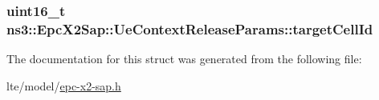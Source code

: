 \subsubsection[{\texorpdfstring{target\+Cell\+Id}{targetCellId}}]{\setlength{\rightskip}{0pt plus 5cm}uint16\+\_\+t ns3\+::\+Epc\+X2\+Sap\+::\+Ue\+Context\+Release\+Params\+::target\+Cell\+Id}\hypertarget{structns3_1_1EpcX2Sap_1_1UeContextReleaseParams_af10d3411c400fcf90dce0120c18fa6ee}{}\label{structns3_1_1EpcX2Sap_1_1UeContextReleaseParams_af10d3411c400fcf90dce0120c18fa6ee}


The documentation for this struct was generated from the following file\+:\begin{DoxyCompactItemize}
\item 
lte/model/\hyperlink{epc-x2-sap_8h}{epc-\/x2-\/sap.\+h}\end{DoxyCompactItemize}

